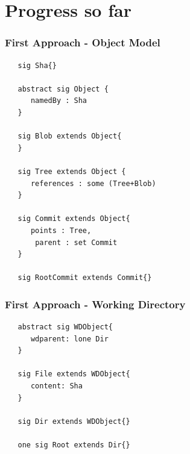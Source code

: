 \documentclass{beamer}
\begin{document}
\section{Progress so far}


\begin{frame}[fragile]
   \frametitle{First Approach - Object Model}
   \footnotesize
   \begin{lstlisting}
   sig Sha{}

   abstract sig Object {
      namedBy : Sha
   }

   sig Blob extends Object{
   }

   sig Tree extends Object {
      references : some (Tree+Blob)
   }

   sig Commit extends Object{
      points : Tree,
  	   parent : set Commit
   }

   sig RootCommit extends Commit{}
   \end{lstlisting}

\end{frame}

\begin{frame}[fragile]
   \frametitle{First Approach - Working Directory}
   \footnotesize
   \begin{lstlisting}
   abstract sig WDObject{
      wdparent: lone Dir
   }

   sig File extends WDObject{
      content: Sha 
   }

   sig Dir extends WDObject{}

   one sig Root extends Dir{}
   \end{lstlisting}
\end{frame}
\end{document}
